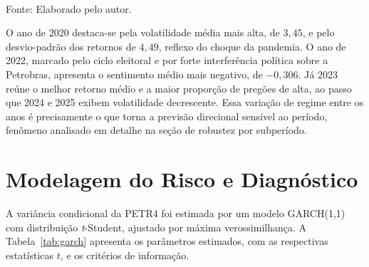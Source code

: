 \begin{table}[htpb]
\centering
\caption{Estatística descritiva anual: pregões, retorno médio e seu desvio-padrão, volatilidade média, sentimento médio e proporção de pregões de alta.}
\label{tab:por_ano}
\vspace{0.2cm}
{\small \\ Fonte: Elaborado pelo autor.}
\end{table}

O ano de 2020 destaca-se pela volatilidade média mais alta, de $3{,}45$, e pelo desvio-padrão dos retornos de $4{,}49$, reflexo do choque da pandemia. O ano de 2022, marcado pelo ciclo eleitoral e por forte interferência política sobre a Petrobras, apresenta o sentimento médio mais negativo, de $-0{,}306$. Já 2023 reúne o melhor retorno médio e a maior proporção de pregões de alta, ao passo que 2024 e 2025 exibem volatilidade decrescente. Essa variação de regime entre os anos é precisamente o que torna a previsão direcional sensível ao período, fenômeno analisado em detalhe na seção de robustez por subperíodo.

\section{Modelagem do Risco e Diagnóstico}

A variância condicional da PETR4 foi estimada por um modelo GARCH(1,1) com distribuição \textit{t}-Student, ajustado por máxima verossimilhança. A Tabela~\ref{tab:garch} apresenta os parâmetros estimados, com as respectivas estatísticas $t$, e os critérios de informação.

